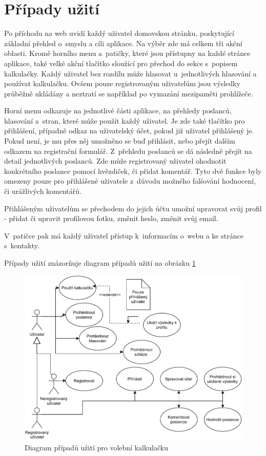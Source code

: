 \section{Případy užití}
Po příchodu na web uvidí každý uživatel domovskou stránku, poskytující základní přehled o~smyslu a cíli aplikace. Na výběr zde má celkem tři akční oblasti. Kromě horního menu a~patičky, které jsou přístupny na každé stránce aplikace, také velké akční tlačítko sloužící pro přechod do sekce s~popisem kalkulačky. Každý uživatel bez rozdílu může hlasovat u~jednotlivých hlasování a používat kalkulačku. Ovšem pouze registrovaným uživatelům jsou výsledky průběžně ukládány a neztratí se například po vymazání mezipaměti prohlížeče.
\par Horní menu odkazuje na jednotlivé části aplikace, na přehledy poslanců, hlasování a~stran, které může použít každý uživatel. Je zde také tlačítko pro přihlášení, případně odkaz na uživatelský účet, pokud již uživatel přihlášený je. Pokud není, je mu přes něj umožněno se buď přihlásit, nebo přejít dalším odkazem na registrační formulář. Z~přehledu poslanců se dá následně přejít na detail jednotlivých poslanců. Zde může registrovaný uživatel ohodnotit konkrétního poslance pomocí hvězdiček, či přidat komentář. Tyto dvě funkce byly omezeny pouze pro přihlášené uživatele z~důvodu možného falšování hodnocení, či urážlivých komentářů. 
\par Přihlášeným uživatelům se přechodem do jejich účtu umožní upravovat svůj profil - přidat či upravit profilovou fotku, změnit heslo, změnit svůj email.
\par V~patičce pak má každý uživatel přístup k~informacím o~webu a ke stránce s~kontakty.

\par
Případy užití znázorňuje diagram případů užití na obrázku \ref{fig:diagram_uc}

\begin{figure}
    \centering
    \includegraphics[width=1\textwidth]{obrazky-figures/UC.pdf}
    \caption{Diagram případů užití pro volební kalkulačku}
    \label{fig:diagram_uc}
\end{figure}



